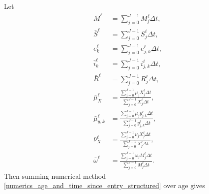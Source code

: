\documentclass[USenglish]{article}
\begin{document}
Let
\begin{subequations}
  \begin{align}
    \bar{M}^{\ell} &= \sum_{j = 0}^{J - 1} M_j^{\ell} \Delta t,
    \\
    \bar{S}^{\ell} &= \sum_{j = 0}^{J - 1} S_j^{\ell} \Delta t,
    \\
    \bar{e}_k^{\ell} &= \sum_{j = 0}^{J - 1} e_{j, k}^{\ell} \Delta t,
    \\
    \bar{i}_k^{\ell} &= \sum_{j = 0}^{J - 1} i_{j, k}^{\ell} \Delta t,
    \\
    \bar{R}^{\ell} &= \sum_{j = 0}^{J - 1} R_j^{\ell} \Delta t,
    \\
    \bar{\mu}_X^{\ell}
    &= \frac{\sum_{j = 0}^{J - 1} \mu_j X_j^{\ell} \Delta t}
    {\sum_{j = 0}^{J - 1} X_j^{\ell} \Delta t},
    \\
    \bar{\mu}_{y, k}^{\ell}
    &= \frac{\sum_{j = 0}^{J - 1} \mu_j y_{j, k}^{\ell} \Delta t}
    {\sum_{j = 0}^{J - 1} y_{j, k}^{\ell} \Delta t},
    \\
    \bar{\nu}_X^{\ell}
    &= \frac{\sum_{j = 0}^{J - 1} \nu_j X_j^{\ell} \Delta t}
    {\sum_{j = 0}^{J - 1} X_j^{\ell} \Delta t},
    \\
    \bar{\omega}^{\ell}
    &= \frac{\sum_{j = 0}^{J - 1} \omega_j M_j^{\ell} \Delta t}
    {\sum_{j = 0}^{J - 1} M_j^{\ell} \Delta t}.
  \end{align}
\end{subequations}
Then summing numerical method
\eqref{numerics_age_and_time_since_entry_structured} over age gives
\end{document}
